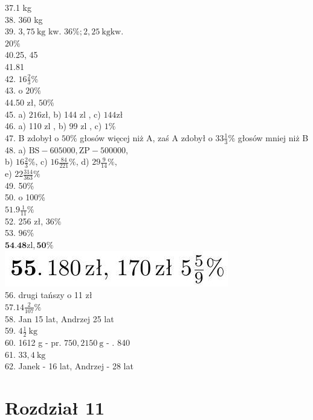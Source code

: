 \documentclass[10pt]{article}
\begin{document}
37.1 kg\\
38. 360 kg\\
39. \(3,75 \mathrm{~kg}\) kw. \(36 \% ; 2,25 \mathrm{~kg} \mathrm{kw}\).\\
\(20 \%\)\\
40.25, 45\\
41.81\\
42. \(16 \frac{2}{3} \%\)\\
43. o \(20 \%\)\\
44.50 zł, \(50 \%\)\\
45. a) \(216 \mathrm{zł}\), b) 144 zl , c) \(144 \mathrm{zł}\)\\
46. a) 110 zl , b) 99 zl , c) \(1 \%\)\\
47. B zdobył o \(50 \%\) głosów więcej niż A, zaś A zdobył o \(33 \frac{1}{3} \%\) głosów mniej niż B\\
48. a) \(\mathrm{BS}-605000, \mathrm{ZP}-500000\),\\
b) \(16 \frac{2}{3} \%\), c) \(16 \frac{84}{221} \%\), d) \(29 \frac{9}{14} \%\),\\
e) \(22 \frac{314}{363} \%\)\\
49. 50\%\\
50. o 100\%\\
\(51.9 \frac{1}{11} \%\)\\
52. 256 zł, \(36 \%\)\\
53. \(96 \%\)\\
\(\mathbf{5 4 . 4 8 \mathrm { zl } , 5 0 \%}\)\\
\includegraphics[max width=\textwidth, center]{2024_11_21_71f62bd117d375398909g-168}\\
56. drugi tańszy o 11 zł\\
\(57.14 \frac{2}{107} \%\)\\
58. Jan 15 lat, Andrzej 25 lat\\
59. \(4 \frac{1}{2} \mathrm{~kg}\)\\
60. 1612 g - pr. \(750,2150 \mathrm{~g}\) - . 840\\
61. \(33,4 \mathrm{~kg}\)\\
62. Janek - 16 lat, Andrzej - 28 lat

\section*{Rozdział 11}
\end{document}
